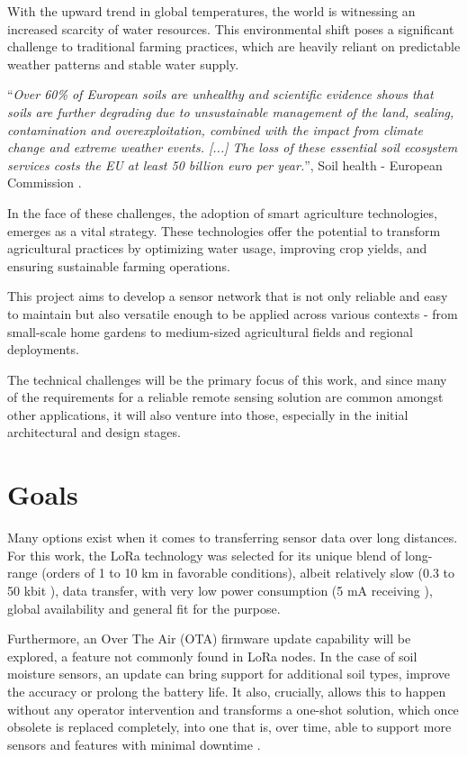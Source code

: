 
With the upward trend in global temperatures, the world is witnessing an increased scarcity of water resources. This environmental shift poses a significant challenge to traditional farming practices, which are heavily reliant on predictable weather patterns and stable water supply. 

``\emph{Over 60\% of European soils are unhealthy and scientific evidence shows that soils are further degrading due to unsustainable management of the land, sealing, contamination and overexploitation, combined with the impact from climate change and extreme weather events. [...] The loss of these essential soil ecosystem services costs the EU at least 50 billion euro per year.}'', Soil health - European Commission \cite{european_commission_soil_2024}.

In the face of these challenges, the adoption of smart agriculture technologies, emerges as a vital strategy. These technologies offer the potential to transform agricultural practices by optimizing water usage, improving crop yields, and ensuring sustainable farming operations.

This project aims to develop a sensor network that is not only reliable and easy to maintain but also versatile enough to be applied across various contexts - from small-scale home gardens to medium-sized agricultural fields and regional deployments. 

The technical challenges will be the primary focus of this work, and since many of the requirements for a reliable remote sensing solution are common amongst other applications, it will also venture into those, especially in the initial architectural and design stages. 

\section{Goals}
Many options exist when it comes to transferring sensor data over long distances. For this work, the LoRa technology was selected for its unique blend of long-range (orders of 1 to 10 km in favorable conditions), albeit relatively slow (0.3 to 50 kbit \cite{semtech_corporation_sx12612_2024}), data transfer, with very low power consumption (5 mA receiving \cite{semtech_corporation_sx12612_2024}), global availability and general fit for the purpose.

Furthermore, an Over The Air (OTA) firmware update capability will be explored, a feature not commonly found in LoRa nodes. In the case of soil moisture sensors, an update can bring support for additional soil types, improve the accuracy or prolong the battery life. It also, crucially, allows this to happen without any operator intervention and transforms a one-shot solution, which once obsolete is replaced completely, into one that is, over time, able to support more sensors and features with minimal downtime \cite{mobility_connected_what_2024,noauthor_android_2024,bucklin_brown_over--air_2024}.

